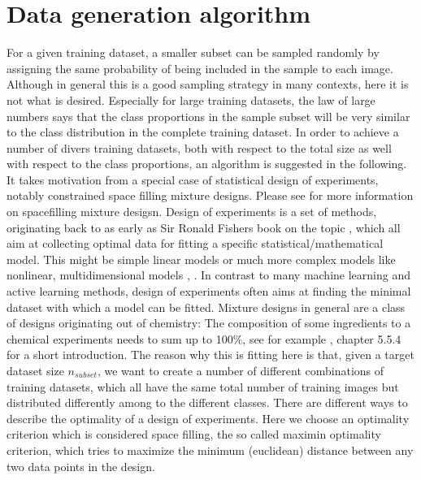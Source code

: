 \documentclass{article} %
\begin{document}
\section{Data generation algorithm}




For a given training dataset, a smaller subset can be sampled randomly by assigning the same probability of being included in the sample to each image.
Although in general this is a good sampling strategy in many contexts, here it is not what is desired.
Especially for large training datasets, the law of large numbers says that the class proportions in the sample subset will be very similar to the class distribution in the complete training dataset.
In order to achieve a number of divers training datasets, both with respect to the total size as well with respect to the class proportions, an algorithm is suggested in the following.
It takes motivation from a special case of statistical design of experiments, notably constrained space filling mixture designs. Please see \cite{gomes_hal_spacefilling_mixtures} for more information on spacefilling mixture desigsn.
Design of experiments is a set of methods, originating back to as early as Sir Ronald Fishers book on the topic \cite{fisher_1935}, which all aim at collecting optimal data for fitting a specific statistical/mathematical model. This might be simple linear models or much more complex
models like nonlinear, multidimensional models \cite{myers2009response}, \cite{Goos_Jones_optDoE_2011}. In contrast to many machine learning and active learning methods, design of experiments
often aims at finding the minimal dataset with which a model can be fitted.
Mixture designs in general are a class of designs originating out of chemistry: The composition of some ingredients to a chemical experiments needs to sum up to 100\%, see for example \cite{Nist_2012_eng_stats}, chapter 5.5.4 for a short introduction.
The reason why this is fitting here is that, given a target dataset size $n_{subset}$, we want to create a number of different combinations of training datasets, which all have the same total number of training images but distributed differently among to the different classes.
There are different ways to describe the optimality of a design of experiments. Here we choose an optimality criterion which is considered space filling, the so called maximin optimality criterion, which tries to maximize the minimum (euclidean) distance between any two data points in the design.
\end{document}
